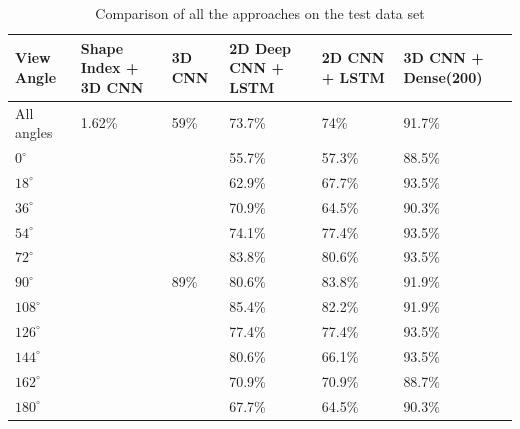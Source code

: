\documentclass[12pt]{article}
\theoremstyle{definition}
\begin{document}
	\begin{table}[h]
		\centering
		\renewcommand{\arraystretch}{1.35}

		\caption{Comparison of all the approaches on the test data set}
		\label{table:all-results}

		\begin{tabularx}{\textwidth}{X|X|X|X|X|X}
			\textbf{View Angle} & \textbf{Shape Index + 3D CNN} & \textbf{3D CNN} & \textbf{2D Deep CNN + LSTM} & \textbf{2D CNN + LSTM} & \textbf{3D CNN + Dense(200)}\\ \hline
			All angles  & 1.62\%               & 59\%                 & 73.7\% & 74\%   & 91.7\% \\ \hline
			$0^\circ$   & \textbf{\textendash} & \textbf{\textendash} & 55.7\% & 57.3\% & 88.5\% \\ \hline
			$18^\circ$  & \textbf{\textendash} & \textbf{\textendash} & 62.9\% & 67.7\% & 93.5\% \\ \hline
			$36^\circ$  & \textbf{\textendash} & \textbf{\textendash} & 70.9\% & 64.5\% & 90.3\% \\ \hline
			$54^\circ$  & \textbf{\textendash} & \textbf{\textendash} & 74.1\% & 77.4\% & 93.5\% \\ \hline
			$72^\circ$  & \textbf{\textendash} & \textbf{\textendash} & 83.8\% & 80.6\% & 93.5\% \\ \hline
			$90^\circ$  & \textbf{\textendash} & 89\%                 & 80.6\% & 83.8\% & 91.9\% \\ \hline
			$108^\circ$ & \textbf{\textendash} & \textbf{\textendash} & 85.4\% & 82.2\% & 91.9\% \\ \hline
			$126^\circ$ & \textbf{\textendash} & \textbf{\textendash} & 77.4\% & 77.4\% & 93.5\% \\ \hline
			$144^\circ$ & \textbf{\textendash} & \textbf{\textendash} & 80.6\% & 66.1\% & 93.5\% \\ \hline
			$162^\circ$ & \textbf{\textendash} & \textbf{\textendash} & 70.9\% & 70.9\% & 88.7\% \\ \hline
			$180^\circ$ & \textbf{\textendash} & \textbf{\textendash} & 67.7\% & 64.5\% & 90.3\% \\
		\end{tabularx}
	\end{table}
\end{document}
